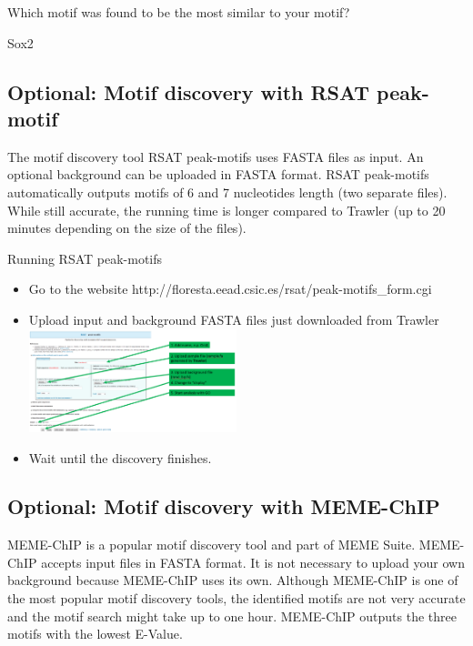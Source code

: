 \begin{questions}
Which motif was found to be the most similar to your motif?
\begin{answer}
Sox2
\end{answer}
\end{questions}

\subsection{Optional: Motif discovery with RSAT peak-motif}
The motif discovery tool RSAT peak-motifs uses FASTA files as input. An optional background can be uploaded in FASTA format. RSAT peak-motifs automatically outputs motifs of 6 and 7 nucleotides length (two separate files). While still accurate, the running time is longer compared to Trawler (up to 20 minutes depending on the size of the files).

\begin{steps}
Running RSAT peak-motifs
\begin{itemize}
	\item Go to the website http://floresta.eead.csic.es/rsat/peak-motifs_form.cgi 
	\item Upload input and background FASTA files just downloaded from Trawler
		\includegraphics[height=3cm]{RSAT1.PNG}
	\item Wait until the discovery finishes. 
\end{itemize}
\end{steps}

\subsection{Optional: Motif discovery with MEME-ChIP}
MEME-ChIP is a popular motif discovery tool and part of MEME Suite. MEME-ChIP accepts input files in FASTA format. It is not necessary to upload your own background because MEME-ChIP uses its own. 
Although MEME-ChIP is one of the most popular motif discovery tools, the identified motifs are not very accurate and the motif search might take up to one hour. MEME-ChIP outputs the three motifs with the lowest E-Value.



